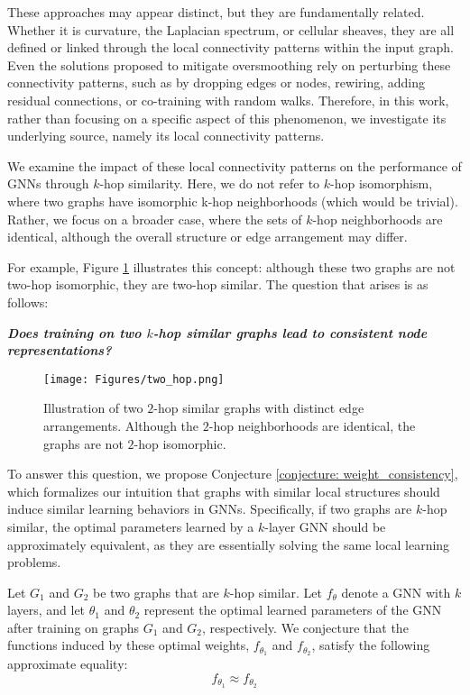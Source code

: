 These approaches may appear distinct, but they are fundamentally related. Whether it is curvature, the Laplacian spectrum, or cellular sheaves, they are all defined or linked through the local connectivity patterns within the input graph. Even the solutions proposed to mitigate oversmoothing rely on perturbing these connectivity patterns, such as by dropping edges or nodes, rewiring, adding residual connections, or co-training with random walks. Therefore, in this work, rather than focusing on a specific aspect of this phenomenon, we investigate its underlying source, namely its local connectivity patterns.

We examine the impact of these local connectivity patterns on the performance of GNNs through $k$-hop similarity. Here, we do not refer to $k$-hop isomorphism, where two graphs have isomorphic k-hop neighborhoods (which would be trivial). Rather, we focus on a broader case, where the sets of $k$-hop neighborhoods are identical, although the overall structure or edge arrangement may differ. 

For example, Figure \ref{two-hop} illustrates this concept: although these two graphs are not two-hop isomorphic, they are two-hop similar. The question that arises is as follows: 
\begin{center}
\textbf{\textit{Does training on two $k$-hop similar graphs lead to consistent node representations?
}}    
\end{center}


\begin{figure}[H]
    \vskip 0.2in
    \begin{center}    \centerline{\texttt{[image: Figures/two\_hop.png]}}
    \caption{Illustration of two $2$-hop similar graphs with distinct edge arrangements. Although the $2$-hop neighborhoods are identical, the graphs are not $2$-hop isomorphic.}
    \label{two-hop}
    \end{center}
    \vskip -0.2in
\end{figure}

To answer this question, we propose Conjecture \ref{conjecture: weight_consistency}, which formalizes our intuition that graphs with similar local structures should induce similar learning behaviors in GNNs. Specifically, if two graphs are $k$-hop similar, the optimal parameters learned by a $k$-layer GNN should be approximately equivalent, as they are essentially solving the same local learning problems.
\begin{conjecture}
\label{conjecture: weight_consistency}
Let $G_1$ and $G_2$ be two graphs that are $k$-hop similar. Let $f_\theta$ denote a GNN with $k$ layers, and let $\theta_1$ and $\theta_2$ represent the optimal learned parameters of the GNN after training on graphs $G_1$ and $G_2$, respectively. We conjecture that the functions induced by these optimal weights, $f_{\theta_1}$ and $f_{\theta_2}$, satisfy the following approximate equality:
\begin{equation*}
    f_{\theta_1} \approx f_{\theta_2}
\end{equation*}
\end{conjecture}

